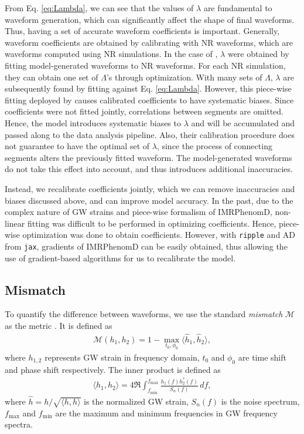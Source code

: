 \documentclass[twocolumn]{aastex631}
\newcommand{\ripple}{\texttt{ripple}}
\newcommand{\jax}{\texttt{jax}}
\begin{document}
From Eq. \ref{eq:Lambda}, we can see that the values of $\lambda$ are fundamental to waveform generation, which can significantly affect the shape of final waveforms. Thus, having a set of accurate waveform coefficients is important. Generally, waveform coefficients are obtained by calibrating with NR waveforms, which are waveforms computed using NR simulations. In the case of \cite{khan2016frequency}, $\lambda$ were obtained by fitting model-generated waveforms to NR waveforms. For each NR simulation, they can obtain one set of $\Lambda$'s through optimization. With many sets of $\Lambda$, $\lambda$ are subsequently found by fitting against Eq. \ref{eq:Lambda}. However, this piece-wise fitting deployed by \cite{khan2016frequency} causes calibrated coefficients to have systematic biases. Since coefficients were not fitted jointly, correlations between segments are omitted. Hence, the model introduces systematic biases to $\lambda$ and will be accumulated and passed along to the data analysis pipeline. Also, their calibration procedure does not guarantee to have the optimal set of $\lambda$, since the process of connecting segments alters the previously fitted waveform. The model-generated waveforms do not take this effect into account, and thus introduces additional inaccuracies. 


Instead, we recalibrate coefficients jointly, which we can remove inaccuracies and biases discussed above, and can improve model accuracy. In the past, due to the complex nature of GW strains and piece-wise formalism of IMRPhenomD, non-linear fitting was difficult to be performed in optimizing coefficients. Hence, piece-wise optimization was done to obtain coefficients. However, with {\ripple} and AD from \jax, gradients of IMRPhenomD can be easily obtained, thus allowing the use of gradient-based algorithms for us to recalibrate the model.   

\subsection{Mismatch} \label{subsec:mismatch}

To quantify the difference between waveforms, we use the standard \textit{mismatch} $\mathcal{M}$ as the metric \cite{husa2016frequency}. It is defined as 
\begin{align} \label{eq:mismatch}
	\mathcal{M}(h_1, h_2)=1-\max_{t_0, \phi_0}\langle \hat{h}_1, \hat{h}_2\rangle,
\end{align}
where $h_{1,2}$ represents GW strain in frequency domain, $t_0$ and $\phi_0$ are time shift and phase shift respectively. The inner product is defined as 
\begin{align}\label{eq:inner_prod}
	\langle h_1, h_2 \rangle=4\Re\int_{f_{\mathrm{min}}}^{f_{\mathrm{max}}}\frac{h_1(f)h_2^{\ast}(f)}{S_n(f)}\,df,
\end{align}
where $\hat{h}=h/\sqrt{\langle h, h \rangle}$ is the normalized GW strain, $S_n(f)$ is the noise spectrum, $f_{\mathrm{max}}$ and $f_{\mathrm{min}}$ are the maximum and minimum frequencies in GW frequency spectra. 
\end{document}
